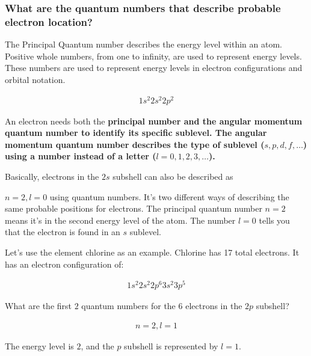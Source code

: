 
\subsubsection*{What are the quantum numbers that describe probable electron location?}

\begin{definition}
    The Principal Quantum number describes the energy level within an atom.
    Positive whole numbers, from one to infinity, are used to represent energy
    levels. These numbers are used to represent energy levels in electron
    configurations and orbital notation.

    \begin{align}
        1s^{2}2s^{2}2p^{2}
    \end{align}
\end{definition}

\begin{definition}
    An electron needs both the \bf{principal number} and the \bf{angular
    momentum quantum number} to identify its specific sublevel. The angular
    momentum quantum number describes the type of sublevel
    ($s, p, d, f, \ldots$) using a number instead of a letter
    ($l = 0, 1, 2, 3, \ldots$).

    Basically, electrons in the $2s$ subshell can also be described as
    
    $n = 2, l = 0$ using quantum numbers. It's two different ways of describing
    the same probable positions for electrons. The principal quantum number $n = 2$
    means it's in the second energy level of the atom. The number $l = 0$ tells
    you that the electron is found in an $s$ sublevel.
    
    Let's use the element chlorine as an example. Chlorine has 17 total
    electrons. It has an electron configuration of:

    \begin{align}
        1s^{2}2s^{2}2p^{6}3s^{2}3p^{5}
    \end{align}
    
    What are the first $2$ quantum numbers for the $6$ electrons in the $2p$ subshell?

    \begin{align}
        n = 2, l = 1
    \end{align}

    The energy level is $2$, and  the $p$ subshell is represented by $l = 1$.
\end{definition}

